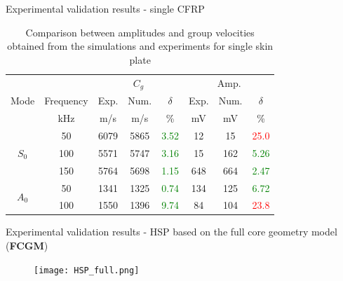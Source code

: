 \documentclass[10pt,aspectratio=169]{beamer} %
\begin{document}
\begin{frame}[label=frame15]{Experimental validation results - single CFRP}
	\begin{table}
		\centering
		\caption{\label{tab:group_velocity_cfrp} Comparison between amplitudes and group velocities obtained from the simulations and experiments for single skin plate}
		\begin{tabular}{cccccccc}
			\toprule
			& & \multicolumn{3}{c}{\(C_g\)} & \multicolumn{3}{c}{Amp.}\\
			Mode & Frequency & Exp. & Num. & \(\delta\)& Exp. & Num. & \(\delta\)\\
			& kHz & m/s & m/s & \% & mV & mV & \% \\
			\midrule
			\multirow{3}{*}{$S_0$} & 50 & 6079 & 5865 & \textcolor{green}{3.52}& 12 & 15 & \textcolor{red}{25.0} \\
			&100& 5571 & 5747 & \textcolor{green}{3.16} & 15 & 162 & \textcolor{green}{5.26}\\
			&150& 5764 & 5698 & \textcolor{green}{1.15} & 648 & 664 & \textcolor{green}{2.47}\\
			\midrule
			\multirow{3}{*}{$A_0$} &50& 1341 & 1325 & \textcolor{green}{0.74} & 134 & 125 & \textcolor{green}{6.72}\\
			&100& 1550 & 1396 & \textcolor{green}{9.74} & 84 & 104 & \textcolor{red}{23.8}\\
			\bottomrule
		\end{tabular}
	\end{table}
\end{frame}
\begin{frame}[label=frame15]{Experimental validation results - HSP based on the full core geometry model (\textbf{FCGM}) }
	\begin{figure}
			\texttt{[image: HSP\_full.png]}
			\label{fig:HSP_full}
		\end{figure}
\end{frame}
\end{document}
